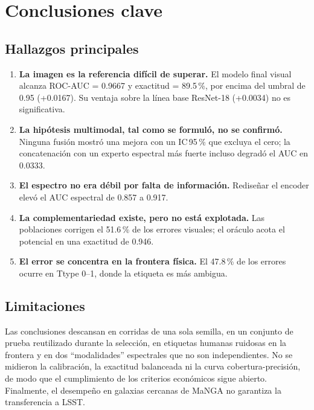 \section{Conclusiones clave}
\label{sec:conclusiones}

\subsection{Hallazgos principales}
\begin{enumerate}
  \item \textbf{La imagen es la referencia difícil de superar.} El modelo final visual alcanza ROC-AUC = 0.9667 y exactitud = 89.5\,\%, por encima del umbral de 0.95 (+0.0167). Su ventaja sobre la línea base ResNet-18 (+0.0034) no es significativa.
  \item \textbf{La hipótesis multimodal, tal como se formuló, no se confirmó.} Ninguna fusión mostró una mejora con un IC\,95\,\% que excluya el cero; la concatenación con un experto espectral más fuerte incluso degradó el AUC en 0.0333.
  \item \textbf{El espectro no era débil por falta de información.} Rediseñar el encoder elevó el AUC espectral de 0.857 a 0.917.
  \item \textbf{La complementariedad existe, pero no está explotada.} Las poblaciones corrigen el 51.6\,\% de los errores visuales; el oráculo acota el potencial en una exactitud de 0.946.
  \item \textbf{El error se concentra en la frontera física.} El 47.8\,\% de los errores ocurre en Ttype 0--1, donde la etiqueta es más ambigua.
\end{enumerate}

\subsection{Limitaciones}
Las conclusiones descansan en corridas de una sola semilla, en un conjunto de prueba reutilizado durante la selección, en etiquetas humanas ruidosas en la frontera y en dos ``modalidades'' espectrales que no son independientes. No se midieron la calibración, la exactitud balanceada ni la curva cobertura-precisión, de modo que el cumplimiento de los criterios económicos sigue abierto. Finalmente, el desempeño en galaxias cercanas de MaNGA no garantiza la transferencia a LSST.

